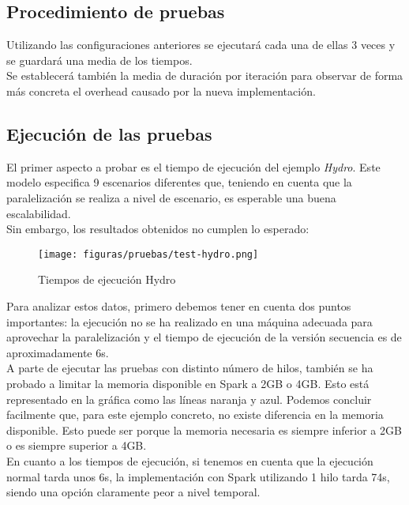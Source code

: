 \subsection{Procedimiento de pruebas}

Utilizando las configuraciones anteriores se ejecutará cada una de ellas 3 veces y se guardará una media de los tiempos.\\

Se establecerá también la media de duración por iteración para observar de forma más concreta el overhead causado por la nueva implementación.

\subsection{Ejecución de las pruebas}

El primer aspecto a probar es el tiempo de ejecución del ejemplo \textit{Hydro}. Este modelo especifica 9 escenarios diferentes que, teniendo en cuenta que la paralelización se realiza a nivel de escenario, es esperable una buena escalabilidad.\\

Sin embargo, los resultados obtenidos no cumplen lo esperado:\\

\begin{figure}[H]
    \centerline{\texttt{[image: figuras/pruebas/test-hydro.png]}}
    \caption{Tiempos de ejecución Hydro}
    \label{fig:test-hydro}
\end{figure}

Para analizar estos datos, primero debemos tener en cuenta dos puntos importantes: la ejecución no se ha realizado en una máquina adecuada para aprovechar la paralelización y el tiempo de ejecución de la versión secuencia es de aproximadamente 6s.\\

A parte de ejecutar las pruebas con distinto número de hilos, también se ha probado a limitar la memoria disponible en Spark a 2GB o 4GB. Esto está representado en la gráfica como las líneas naranja y azul. Podemos concluir facilmente que, para este ejemplo concreto, no existe diferencia en la memoria disponible. Esto puede ser porque la memoria necesaria es siempre inferior a 2GB o es siempre superior a 4GB. \\

En cuanto a los tiempos de ejecución, si tenemos en cuenta que la ejecución normal tarda unos 6s, la implementación con Spark utilizando 1 hilo tarda 74s, siendo una opción claramente peor a nivel temporal.\\

